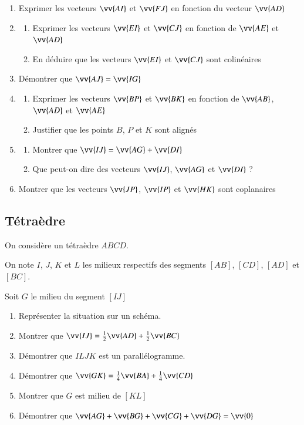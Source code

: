 \documentclass[oneside,12pt]{article}          %
\begin{document}
\begin{enumerate}
    \item Exprimer les vecteurs $\vv{AI}$ et $\vv{FJ}$ en fonction du vecteur $\vv{AD}$
    \item \begin{enumerate}
        \item Exprimer les vecteurs $\vv{EI}$ et $\vv{CJ}$ en fonction de $\vv{AE}$ et $\vv{AD}$
        \item En déduire que les vecteurs $\vv{EI}$ et $\vv{CJ}$ sont colinéaires
    \end{enumerate}
    \item Démontrer que $\vv{AJ}=\vv{IG}$
    \item \begin{enumerate}
        \item Exprimer les vecteurs $\vv{BP}$ et $\vv{BK}$ en fonction de $\vv{AB}$, $\vv{AD}$ et $\vv{AE}$
        \item Justifier que les points $B$, $P$ et $K$ sont alignés
    \end{enumerate}
    \item \begin{enumerate}
        \item Montrer que $\vv{IJ}=\vv{AG}+\vv{DI}$
        \item Que peut-on dire des vecteurs $\vv{IJ}$, $\vv{AG}$ et $\vv{DI}$ ?
    \end{enumerate}
    \item Montrer que les vecteurs $\vv{JP}$, $\vv{IP}$ et $\vv{HK}$ sont coplanaires
\end{enumerate}



\subsection{Tétraèdre}
On considère un tétraèdre $ABCD$.

On note $I$, $J$, $K$ et $L$ les milieux respectifs des segments $[AB]$, $[CD]$, $[AD]$ et $[BC]$.

Soit $G$ le milieu du segment $[IJ]$
\begin{enumerate}
	\item Représenter la situation sur un schéma.
	\item Montrer que $\vv{IJ}=\frac{1}{2}\vv{AD}+\frac{1}{2}\vv{BC}$
	\item Démontrer que $ILJK$ est un parallélogramme.
	\item Démontrer que $\vv{GK}=\frac{1}{4}\vv{BA}+\frac{1}{4}\vv{CD}$
	\item Montrer que $G$ est milieu de $[KL]$
	\item Démontrer que $\vv{AG}+\vv{BG}+\vv{CG}+\vv{DG}=\vv{0}$
\end{enumerate}
\end{document}
